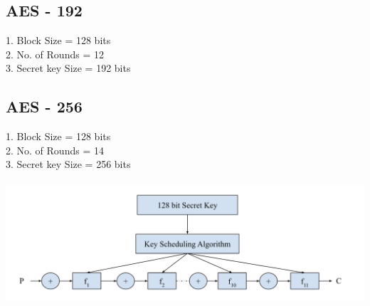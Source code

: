 \documentclass[11pt]{article}
\begin{document}
\subsection*{AES - 192}
1. Block Size = 128 bits \\
2. No. of Rounds = 12 \\
3. Secret key Size = 192 bits

\subsection*{AES - 256}
1. Block Size = 128 bits \\
2. No. of Rounds = 14 \\
3. Secret key Size = 256 bits \\
\\
\includegraphics[width=500pt]{p1.png}
\end{document}
